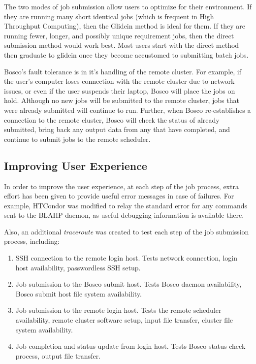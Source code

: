The two modes of job submission allow users to optimize for their environment.  If they are running many short identical jobs (which is frequent in High Throughput Computing), then the Glidein method is ideal for them.  If they are running fewer, longer, and possibly unique requirement jobs, then the direct submission method would work best.  Most users start with the direct method then graduate to glidein once they become accustomed to submitting batch jobs.

Bosco's fault tolerance is in it's handling of the remote cluster.  For example, if the user's computer loses connection with the remote cluster due to network issues, or even if the user suspends their laptop, Bosco will place the jobs on hold.  Although no new jobs will be submitted to the remote cluster, jobs that were already submitted will continue to run.  Further, when Bosco re-establishes a connection to the remote cluster, Bosco will check the status of already submitted, bring back any output data from any that have completed, and continue to submit jobs to the remote scheduler.

\subsection{Improving User Experience}


In order to improve the user experience, at each step of the job process, extra effort has been given to provide useful error messages in case of failures.  For example, HTCondor was modified to relay the standard error for any commands sent to the BLAHP daemon, as useful debugging information is available there.  

\label{sec:boscotraceroute}

Also, an additional \emph{traceroute} was created to test each step of the job submission process, including:

\begin{enumerate}
\item SSH connection to the remote login host.  Tests network connection, login host availability, passwordless SSH setup.
\item Job submission to the Bosco submit host.  Tests Bosco daemon availability, Bosco submit host file system availability.
\item Job submission to the remote login host.  Tests the remote scheduler availability, remote cluster software setup, input file transfer, cluster file system availability.
\item Job completion and status update from login host.  Tests Bosco status check process, output file transfer.
\end{enumerate}


